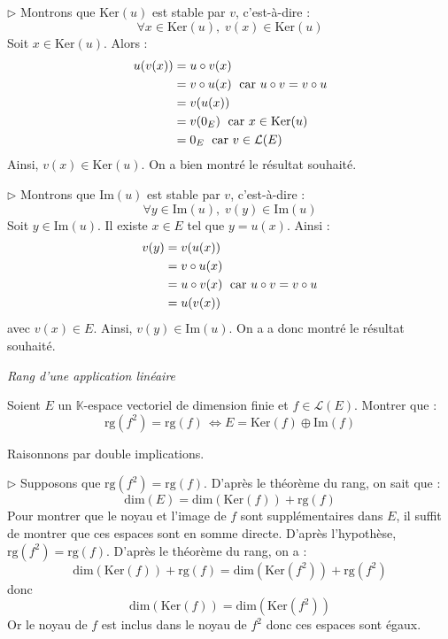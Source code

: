 \documentclass[a4paper,10pt]{report}
\begin{document}
\noindent $\rhd$ Montrons que $\textrm{Ker}(u)$ est stable par $v$, c'est-à-dire :
$$ \forall x \in \textrm{Ker}(u), \; v(x) \in \textrm{Ker}(u)$$
Soit $x \in \textrm{Ker}(u)$. Alors :
\begin{align*}
u (v(x)) & = u \circ v (x) \\
& = v \circ u (x) \; \hbox{ car } u \circ v = v \circ u \\
& = v(u(x)) \\
& = v(0_E) \; \hbox{ car } x \in \textrm{Ker}(u) \\
& = 0_E \; \hbox{ car } v \in \mathcal{L}(E)
\end{align*}
Ainsi, $v(x) \in \textrm{Ker}(u)$. On a bien montré le résultat souhaité.

\medskip

\noindent $\rhd$ Montrons que $\textrm{Im}(u)$ est stable par $v$, c'est-à-dire :
$$ \forall y \in \textrm{Im}(u), \; v(y) \in \textrm{Im}(u)$$
Soit $y \in \textrm{Im}(u)$. Il existe $x \in E$ tel que $y = u(x)$. Ainsi :
\begin{align*}
v(y) & = v (u(x)) \\
& = v \circ u(x) \\
& = u \circ v(x) \; \hbox{ car } u \circ v = v \circ u \\
& = u (v(x)) 
\end{align*}
avec $v(x) \in E$. Ainsi, $v(y) \in \textrm{Im}(u)$. On a a donc montré le résultat souhaité.


\medskip


\begin{center}
\textit{{ {\large Rang d'une application linéaire}}}
\end{center}

\medskip


\begin{Exercice}{} Soient $E$ un $\mathbb{K}$-espace vectoriel de dimension finie et $f \in \mathcal{L}(E)$. Montrer que :
$$ \textrm{rg}(f^2 ) =  \textrm{rg}( f ) \, \Longleftrightarrow E = \textrm{Ker}(f) \oplus \textrm{Im}(f) $$
\end{Exercice}

\corr Raisonnons par double implications.

\medskip

\noindent $\rhd$ Supposons que $\textrm{rg}(f^2 ) =  \textrm{rg}( f )$. D'après le théorème du rang, on sait que :
$$ \textrm{dim}(E) = \textrm{dim}( \textrm{Ker}(f)) + \textrm{rg}( f )$$
Pour montrer que le noyau et l'image de $f$ sont supplémentaires dans $E$, il suffit de montrer que ces espaces sont en somme directe. D'après l'hypothèse, $\textrm{rg}(f^2 ) =  \textrm{rg}( f )$. D'après le théorème du rang, on a :
$$ \textrm{dim}( \textrm{Ker}(f)) + \textrm{rg}( f ) = \textrm{dim}( \textrm{Ker}(f^2)) + \textrm{rg}( f^2)$$
donc 
$$ \textrm{dim}( \textrm{Ker}(f)) = \textrm{dim}( \textrm{Ker}(f^2))$$
Or le noyau de $f$ est inclus dans le noyau de $f^2$ donc ces espaces sont égaux.
\end{document}
